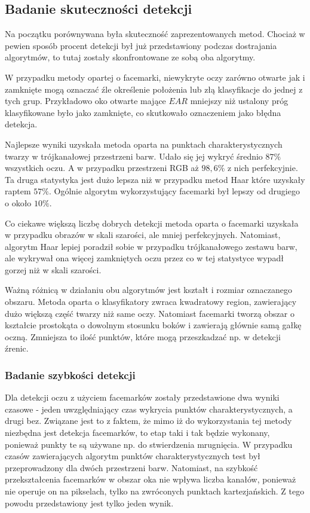 \subsection{Badanie skuteczności detekcji}

Na początku porównywana była skuteczność zaprezentowanych metod. Chociaż w pewien sposób procent detekcji był już przedstawiony podczas dostrajania algorytmów, to tutaj zostały skonfrontowane ze sobą oba algorytmy.
\par
W przypadku metody opartej o facemarki, niewykryte oczy zarówno otwarte jak i zamknięte mogą oznaczać źle określenie położenia lub złą klasyfikacje do jednej z tych grup. Przykładowo oko otwarte mające $EAR$ mniejszy niż ustalony próg klasyfikowane było jako zamknięte, co skutkowało oznaczeniem jako błędna detekcja. 



Najlepsze wyniki uzyskała metoda oparta na punktach charakterystycznych twarzy w trójkanałowej przestrzeni barw. Udało się jej wykryć średnio  $87\%$ wszystkich oczu. A w przypadku przestrzeni RGB aż $98,6\%$ z nich perfekcyjnie. Ta druga statystyka jest dużo lepsza niż w przypadku metod Haar które uzyskały raptem $57\%$. Ogólnie algorytm wykorzystujący facemarki był lepszy od drugiego o około $10\%$.
\par
Co ciekawe większą liczbę dobrych detekcji metoda oparta o facemarki uzyskała w przypadku obrazów w skali szarości, ale mniej perfekcyjnych. Natomiast, algorytm Haar lepiej poradził sobie w przypadku trójkanałowego zestawu barw, ale wykrywał ona więcej zamkniętych oczu przez co w tej statystyce wypadł gorzej niż w skali szarości. 

\vspace{5mm}

Ważną różnicą w działaniu obu algorytmów jest kształt i rozmiar oznaczanego obszaru. Metoda oparta o klasyfikatory zwraca kwadratowy region, zawierający dużo większą część twarzy niż same oczy. Natomiast facemarki tworzą obszar o kształcie prostokąta o dowolnym stosunku boków i zawierają głównie samą gałkę oczną. Zmniejsza to ilość punktów, które mogą przeszkadzać np. w detekcji źrenic.

\subsubsection{Badanie szybkości detekcji} \label{section:eye_detection_speed_img}


Dla detekcji oczu z użyciem facemarków zostały przedstawione dwa wyniki czasowe - jeden uwzględniający czas wykrycia punktów charakterystycznych, a drugi bez. Związane jest to z faktem, że mimo iż do wykorzystania tej metody niezbędna jest detekcja facemarków, to etap taki i tak będzie wykonany, ponieważ punkty te są używane np. do stwierdzenia mrugnięcia. W przypadku czasów zawierających algorytm punktów charakterystycznych test był przeprowadzony dla dwóch przestrzeni barw. Natomiast, na szybkość przekształcenia facemarków w obszar oka nie wpływa liczba kanałów, ponieważ nie operuje on na pikselach, tylko na zwróconych punktach kartezjańskich. Z tego powodu przedstawiony jest tylko jeden wynik.

